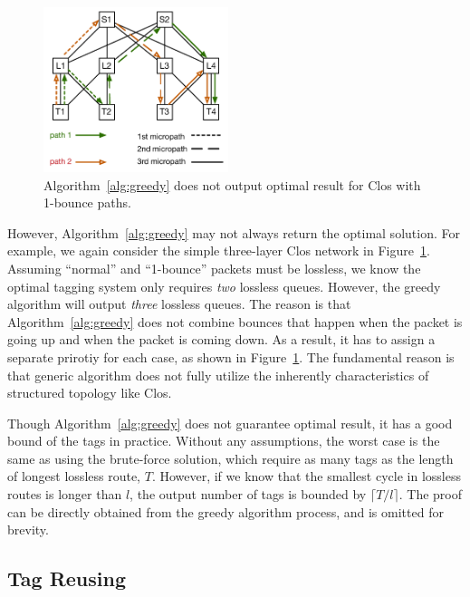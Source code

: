 \begin{figure}[t]
	\centering
	\includegraphics[width=0.48\textwidth] {figs/nonoptimal_example}
	\caption{Algorithm~\ref{alg:greedy} does not output optimal result for Clos with 1-bounce paths.}
	\label{fig:nonoptimal}
\end{figure}

However, Algorithm~\ref{alg:greedy} may not always return the optimal solution. For example, 
we again consider the simple three-layer Clos network in Figure~\ref{fig:nonoptimal}. 
Assuming ``normal'' and ``1-bounce'' packets must be lossless,  
we know the optimal tagging system only requires {\em two} lossless queues. However, the 
greedy algorithm will output {\em three} lossless queues. The reason is that 
Algorithm~\ref{alg:greedy} does not combine bounces that happen when the packet is going up
and when the packet is coming down. As a result, it has to 
assign a separate prirotiy for each case, as shown in Figure~\ref{fig:nonoptimal}.
The fundamental reason is that generic algorithm does not fully utilize the inherently 
characteristics of structured topology like Clos. 


 Though Algorithm~\ref{alg:greedy} does not guarantee optimal result, 
it has a good bound of the tags in practice. Without any assumptions, the worst case 
is the same as using the brute-force solution, which require as many tags as the length of 
longest lossless route, $T$. However, if we know that the smallest cycle in lossless routes
is longer than $l$, the output number of tags is bounded by $\lceil T/l \rceil$. The proof
can be directly obtained from the greedy algorithm process, and is omitted for brevity.

\subsection{Tag Reusing}

